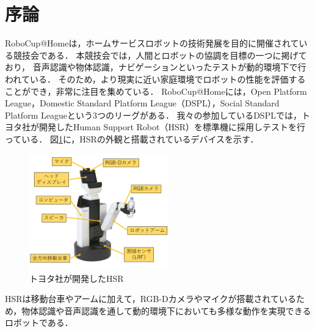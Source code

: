 \documentclass[a4j]{jarticle}
\begin{document}
\maketitle
\thispagestyle{empty}


\section{序論}
RoboCup@Home\cite{robocup_hp}は，ホームサービスロボットの技術発展を目的に開催されている競技会である．
本競技会では，人間とロボットの協調を目標の一つに掲げており，
音声認識や物体認識，ナビゲーションといったテストが動的環境下で行われている．
そのため，より現実に近い家庭環境でロボットの性能を評価することができ，非常に注目を集めている．
RoboCup@Homeには，Open Platform League，Domestic Standard Platform League（DSPL），Social Standard Platform Leagueという3つのリーグがある．
我々の参加しているDSPLでは，トヨタ社が開発したHuman Support Robot（HSR）\cite{hsr_paper}を標準機に採用しテストを行っている．
図\ref{overview_hsr}に，HSRの外観と搭載されているデバイスを示す．
\begin{figure}[ht]
  \centering
  \includegraphics[width=6cm]{images/hsr/hsr_explain_ja.png}
  \caption{トヨタ社が開発したHSR}
  \label{overview_hsr}
\end{figure}
HSRは移動台車やアームに加えて，RGB-Dカメラやマイクが搭載されているため，物体認識や音声認識を通して動的環境下においても多様な動作を実現できるロボットである．
\end{document}
